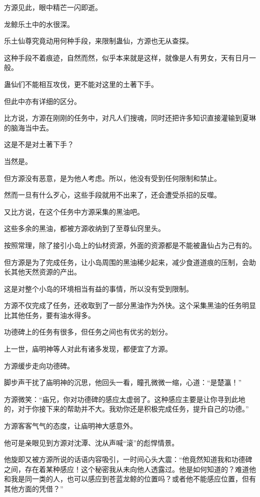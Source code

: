 \begin{this_body}
方源见此，眼中精芒一闪即逝。

龙鲸乐土中的水很深。

乐土仙尊究竟动用何种手段，来限制蛊仙，方源也无从查探。

这种手段不着痕迹，自然而然，似乎本来就是这样，就像是人有男女，天有日月一般。

蛊仙们不能相互攻伐，更不能对这里的土著下手。

但此中亦有详细的区分。

比方说，方源在刚刚的任务中，对凡人们搜魂，同时还把许多知识直接灌输到夏琳的脑海当中去。

这是不是对土著下手？

当然是。

但方源没有恶意，是为他人考虑。所以，他没有受到任何限制和禁止。

然而一旦有什么歹心，这些手段就用不出来了，还会遭受杀招的反噬。

又比方说，在这个任务中方源采集的黑油吧。

这些多余的黑油，都被方源收纳到了至尊仙窍里头。

按照常理，除了接引小岛上的仙材资源，外面的资源都是不能被蛊仙占为己有的。

但方源是为了完成任务，让小岛周围的黑油稀少起来，减少食道道痕的压制，会助长其他天然资源的产出。

这是对整个小岛的环境相当有益的事情，所以没有受到限制。

方源不仅完成了任务，还收取到了一部分黑油作为外快。这个采集黑油的任务明显比其他任务，要有油水得多。

功德碑上的任务有很多，但任务之间也有优劣的划分。

上一世，庙明神等人对此有诸多发现，都便宜了方源。

方源缓步走向功德碑。

脚步声干扰了庙明神的沉思，他回头一看，瞳孔微微一缩，心道：“是楚瀛！”

方源微笑：“庙兄，你对功德碑的感应太虚弱了。这种感应主要是让你寻到此地的，对于你接下来的帮助并不大。我劝你还是积极完成任务，提升自己的功德。”

方源客客气气的态度，让庙明神大感意外。

他可是亲眼见到方源对沈潭、沈从声喊“滚”的彪悍情景。

他旋即又被方源所说的话语内容吸引，一时间心头大震：“他竟然知道我和功德碑之间，存在着某种感应！这个秘密我从未向他人透露过。他是如何知道的？难道他和我是同一类的人，也可以感应到苍蓝龙鲸的位置吗？或者他不能感应位置，但有其他方面的凭借？”


\end{this_body}
